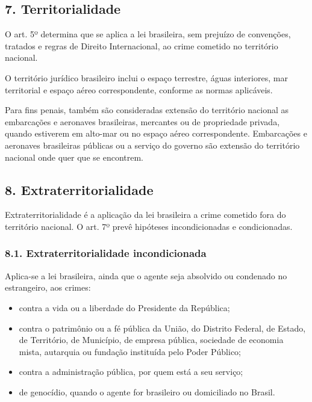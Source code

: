 \documentclass[11pt,a4paper]{article}
\begin{document}
\subsection*{7. Territorialidade}

O art. 5º determina que se aplica a lei brasileira, sem prejuízo de convenções, tratados e regras de Direito Internacional, ao crime cometido no território nacional.

O território jurídico brasileiro inclui o espaço terrestre, águas interiores, mar territorial e espaço aéreo correspondente, conforme as normas aplicáveis.

Para fins penais, também são consideradas extensão do território nacional as embarcações e aeronaves brasileiras, mercantes ou de propriedade privada, quando estiverem em alto-mar ou no espaço aéreo correspondente. Embarcações e aeronaves brasileiras públicas ou a serviço do governo são extensão do território nacional onde quer que se encontrem.

\subsection*{8. Extraterritorialidade}

Extraterritorialidade é a aplicação da lei brasileira a crime cometido fora do território nacional. O art. 7º prevê hipóteses incondicionadas e condicionadas.

\subsubsection*{8.1. Extraterritorialidade incondicionada}

Aplica-se a lei brasileira, ainda que o agente seja absolvido ou condenado no estrangeiro, aos crimes:

\begin{itemize}
  \item contra a vida ou a liberdade do Presidente da República;
  \item contra o patrimônio ou a fé pública da União, do Distrito Federal, de Estado, de Território, de Município, de empresa pública, sociedade de economia mista, autarquia ou fundação instituída pelo Poder Público;
  \item contra a administração pública, por quem está a seu serviço;
  \item de genocídio, quando o agente for brasileiro ou domiciliado no Brasil.
\end{itemize}
\end{document}
